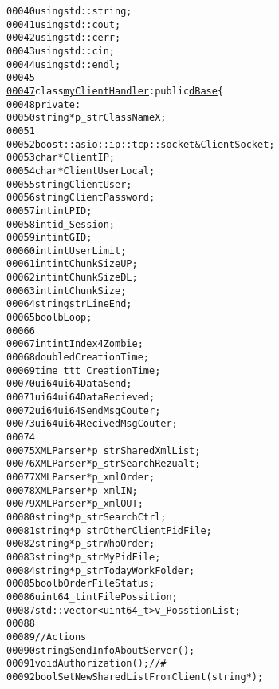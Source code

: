 \begin{footnotesize}
\begin{alltt}
00040 \textcolor{keyword}{using} std::string;
00041 \textcolor{keyword}{using} std::cout;
00042 \textcolor{keyword}{using} std::cerr;
00043 \textcolor{keyword}{using} std::cin;
00044 \textcolor{keyword}{using} std::endl;
00045 
\hypertarget{myClientHandler_8hpp_source_l00047}{}\hyperlink{classmyClientHandler}{00047} \textcolor{keyword}{class }\hyperlink{classmyClientHandler}{myClientHandler}:\textcolor{keyword}{public} \hyperlink{classdBase}{dBase}\{
00048     \textcolor{keyword}{private}:
00050         \textcolor{keywordtype}{string} *p\_strClassNameX;
00051 
00052         boost::asio::ip::tcp::socket &ClientSocket;
00053         \textcolor{keywordtype}{char} *ClientIP;
00054         \textcolor{keywordtype}{char} *ClientUserLocal;
00055         \textcolor{keywordtype}{string} ClientUser;
00056         \textcolor{keywordtype}{string} ClientPassword;
00057         \textcolor{keywordtype}{int} intPID;
00058         \textcolor{keywordtype}{int} id\_Session;
00059         \textcolor{keywordtype}{int} intGID;
00060         \textcolor{keywordtype}{int} intUserLimit;
00061         \textcolor{keywordtype}{int} intChunkSizeUP;
00062         \textcolor{keywordtype}{int} intChunkSizeDL;
00063         \textcolor{keywordtype}{int} intChunkSize;
00064         \textcolor{keywordtype}{string} strLineEnd;
00065         \textcolor{keywordtype}{bool} bLoop;
00066 
00067         \textcolor{keywordtype}{int} intIndex4Zombie;
00068         \textcolor{keywordtype}{double} dCreationTime;
00069         time\_t tt\_CreationTime;
00070         ui64 ui64DataSend;
00071         ui64 ui64DataRecieved;
00072         ui64 ui64SendMsgCouter;
00073         ui64 ui64RecivedMsgCouter;
00074 
00075         XMLParser *p\_strSharedXmlList;
00076         XMLParser *p\_strSearchRezualt;
00077         XMLParser *p\_xmlOrder;
00078         XMLParser *p\_xmlIN;
00079         XMLParser *p\_xmlOUT;
00080         \textcolor{keywordtype}{string} *p\_strSearchCtrl;
00081         \textcolor{keywordtype}{string} *p\_strOtherClientPidFile;
00082         \textcolor{keywordtype}{string} *p\_strWhoOrder;
00083         \textcolor{keywordtype}{string} *p\_strMyPidFile;
00084         \textcolor{keywordtype}{string} *p\_strTodayWorkFolder;
00085         \textcolor{keywordtype}{bool} bOrderFileStatus;
00086         uint64\_t intFilePossition;
00087         std::vector<uint64\_t> v\_PosstionList;
00088 
00089         \textcolor{comment}{//Actions}
00090         \textcolor{keywordtype}{string} SendInfoAboutServer();
00091         \textcolor{keywordtype}{void} Authorization();\textcolor{comment}{//#}
00092         \textcolor{keywordtype}{bool} SetNewSharedListFromClient(\textcolor{keywordtype}{string}*);

\end{alltt}
\end{footnotesize}
